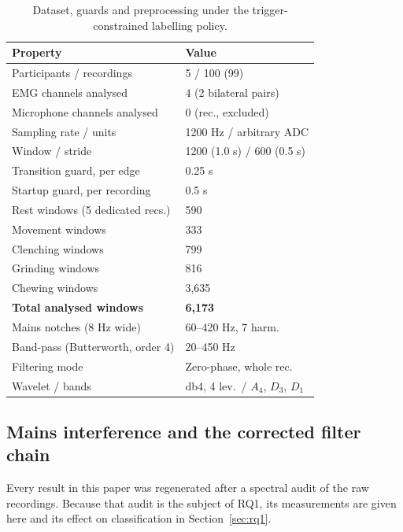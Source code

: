 \documentclass[pdflatex,sn-nature,iicol]{sn-jnl}
\begin{document}
\begin{table}[t]
  \caption{Dataset, guards and preprocessing under the trigger-constrained labelling policy.}
  \label{tab:dataset}
  \centering
  \footnotesize
  \begin{tabular*}{\columnwidth}{@{\extracolsep{\fill}}ll@{}}
    \toprule
    Property & Value \\
    \midrule
    Participants / recordings & 5 / 100 (99) \\
    EMG channels analysed & 4 (2 bilateral pairs) \\
    Microphone channels analysed & 0 (rec., excluded) \\
    Sampling rate / units & 1200 Hz / arbitrary ADC \\
    Window / stride & 1200 (1.0 s) / 600 (0.5 s) \\
    Transition guard, per edge & 0.25 s \\
    Startup guard, per recording & 0.5 s \\
    \midrule
    Rest windows (5 dedicated recs.) & 590 \\
    Movement windows & 333 \\
    Clenching windows & 799 \\
    Grinding windows & 816 \\
    Chewing windows & 3,635 \\
    \textbf{Total analysed windows} & \textbf{6{,}173} \\
    \midrule
    Mains notches (8 Hz wide) & 60--420 Hz, 7 harm. \\
    Band-pass (Butterworth, order 4) & 20--450 Hz \\
    Filtering mode & Zero-phase, whole rec. \\
    Wavelet / bands & db4, 4 lev.\ / $A_4$, $D_3$, $D_1$ \\
    \bottomrule
  \end{tabular*}
\end{table}

\subsection{Mains interference and the corrected filter chain}
\label{sec:filter}

Every result in this paper was regenerated after a spectral audit of the raw recordings. Because that audit is the subject of RQ1, its measurements are given here and its effect on classification in Section~\ref{sec:rq1}.
\end{document}
